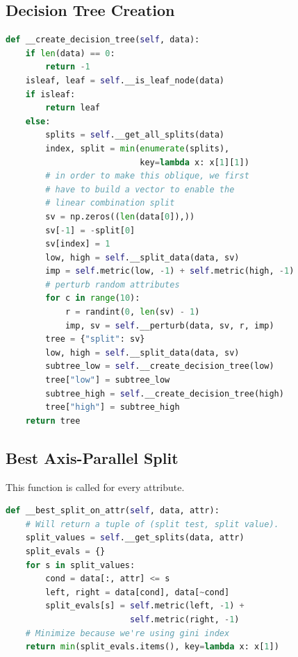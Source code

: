 \documentclass[12pt]{article}
\begin{document}
\subsection{Decision Tree Creation}
\begin{lstlisting}[language=Python]
def __create_decision_tree(self, data):
    if len(data) == 0:
        return -1
    isleaf, leaf = self.__is_leaf_node(data)
    if isleaf:
        return leaf
    else:
        splits = self.__get_all_splits(data)
        index, split = min(enumerate(splits), 
                           key=lambda x: x[1][1])
        # in order to make this oblique, we first 
        # have to build a vector to enable the
        # linear combination split
        sv = np.zeros((len(data[0]),))
        sv[-1] = -split[0]
        sv[index] = 1
        low, high = self.__split_data(data, sv)
        imp = self.metric(low, -1) + self.metric(high, -1)
        # perturb random attributes
        for c in range(10):
            r = randint(0, len(sv) - 1)
            imp, sv = self.__perturb(data, sv, r, imp)
        tree = {"split": sv}
        low, high = self.__split_data(data, sv)
        subtree_low = self.__create_decision_tree(low)
        tree["low"] = subtree_low
        subtree_high = self.__create_decision_tree(high)
        tree["high"] = subtree_high
    return tree
\end{lstlisting}

\subsection{Best Axis-Parallel Split}
This function is called for every attribute.
\begin{lstlisting}[language=Python]
def __best_split_on_attr(self, data, attr):
    # Will return a tuple of (split test, split value).
    split_values = self.__get_splits(data, attr)
    split_evals = {}
    for s in split_values:
        cond = data[:, attr] <= s
        left, right = data[cond], data[~cond]
        split_evals[s] = self.metric(left, -1) + 
                         self.metric(right, -1)
    # Minimize because we're using gini index
    return min(split_evals.items(), key=lambda x: x[1])
\end{lstlisting}
\end{document}
